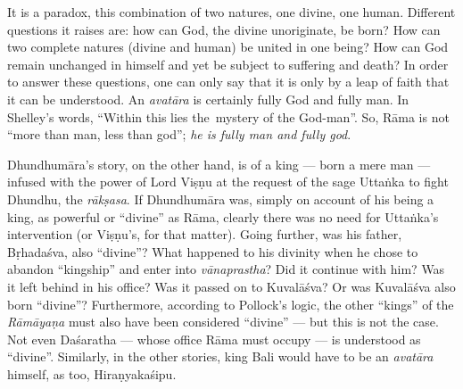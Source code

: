 It is a paradox, this combination of two natures, one divine, one human. Different questions it raises are: how can God, the divine unoriginate, be born? How can two complete natures (divine and human) be united in one being? How can God remain unchanged in himself and yet be subject to suffering and death? In order to answer these questions, one can only say that it is only by a leap of faith that it can be understood. An {\sl avatāra} is certainly fully God and fully man. In Shelley’s  words, “Within this lies the mystery of the God-man”. So, Rāma is not “more than man, less than god”; {\sl he is fully man and fully god}. 

Dhundhumāra’s  story, on the other hand, is of a king --- born a mere man --- infused with the power of Lord Viṣṇu at the request of the sage Uttaṅka to fight Dhundhu, the {\sl rākṣasa}. If Dhundhumāra was, simply on account of his being a king, as powerful or “divine” as Rāma, clearly there was no need for Uttaṅka’s intervention (or Viṣṇu’s, for that matter). Going further, was his father, Bṛhadaśva, also “divine”? What happened to his divinity when he chose to abandon “kingship” and enter into {\sl vānaprastha}? Did it continue with him?  Was it left behind in his office? Was it passed on to Kuvalāśva? Or was Kuvalāśva also born “divine”? Furthermore, according to Pollock’s logic, the other “kings” of the {\sl Rāmāyaṇa} must also have been considered “divine” --- but this is not the case. Not even Daśaratha --- whose office Rāma must occupy --- is understood as “divine”. Similarly, in the other stories, king Bali would have to be an {\sl avatāra} himself, as too, Hiraṇyakaśipu. 
 
